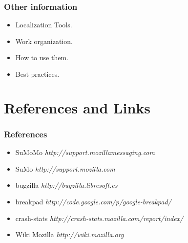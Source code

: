 \documentclass{beamer}
\begin{document}


\begin{frame}
\frametitle{Other information }
 \begin{itemize}
  \item Localization Tools.
  \item Work organization.
  \item How to use them.
  \item Best practices.
 \end{itemize}
\end{frame}


\section{References and Links}

\begin{frame}
 \frametitle{References}
 \begin{itemize}
    \item SuMoMo \textit{http://support.mozillamessaging.com}
    \item SuMo \textit{http://support.mozilla.com}
    \item bugzilla \textit{http://bugzilla.libresoft.es}
    \item breakpad \textit{http://code.google.com/p/google-breakpad/}
    \item crash-stats \textit{http://crash-stats.mozilla.com/report/index/}
    \item Wiki Mozilla \textit{http://wiki.mozilla.org}
  \end{itemize}

\end{frame}

\end{document}
